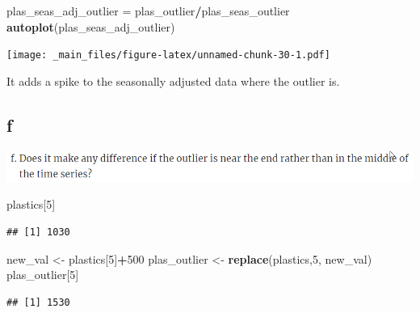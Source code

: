 \documentclass[]{book}
\newenvironment{Shaded}{\begin{snugshade}}{\end{snugshade}}
\newcommand{\DataTypeTok}[1]{\textcolor[rgb]{0.13,0.29,0.53}{#1}}
\newcommand{\DecValTok}[1]{\textcolor[rgb]{0.00,0.00,0.81}{#1}}
\newcommand{\KeywordTok}[1]{\textcolor[rgb]{0.13,0.29,0.53}{\textbf{#1}}}
\newcommand{\NormalTok}[1]{#1}
\newcommand{\OperatorTok}[1]{\textcolor[rgb]{0.81,0.36,0.00}{\textbf{#1}}}
\newcommand{\StringTok}[1]{\textcolor[rgb]{0.31,0.60,0.02}{#1}}
\begin{document}
\begin{Shaded}
\begin{Highlighting}[]
\NormalTok{plas_seas_adj_outlier =}\StringTok{ }\NormalTok{plas_outlier}\OperatorTok{/}\NormalTok{plas_seas_outlier}
\KeywordTok{autoplot}\NormalTok{(plas_seas_adj_outlier)}
\end{Highlighting}
\end{Shaded}

\texttt{[image: \_main\_files/figure-latex/unnamed-chunk-30-1.pdf]}

It adds a spike to the seasonally adjusted data where the outlier is.

\hypertarget{f-1}{%
\subsection{f}\label{f-1}}

\includegraphics{./week2/6.2f.png}

\begin{Shaded}
\begin{Highlighting}[]
\NormalTok{plastics[}\DecValTok{5}\NormalTok{]}
\end{Highlighting}
\end{Shaded}

\begin{verbatim}
## [1] 1030
\end{verbatim}

\begin{Shaded}
\begin{Highlighting}[]
\NormalTok{new_val <-}\StringTok{ }\NormalTok{plastics[}\DecValTok{5}\NormalTok{]}\OperatorTok{+}\DecValTok{500}
\NormalTok{plas_outlier <-}\StringTok{ }\KeywordTok{replace}\NormalTok{(plastics,}\DecValTok{5}\NormalTok{, new_val)}
\NormalTok{plas_outlier[}\DecValTok{5}\NormalTok{]}
\end{Highlighting}
\end{Shaded}

\begin{verbatim}
## [1] 1530
\end{verbatim}

\begin{Shaded}
\end{Shaded}
\end{document}
